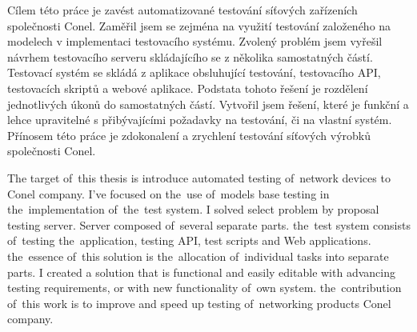 \startAbstractCz
Cílem této práce je zavést automatizované testování síťových zařízeních společnosti Conel. Zaměřil jsem se zejména na využití testování založeného na modelech v implementaci testovacího systému. Zvolený problém jsem vyřešil návrhem testovacího serveru skládajícího se z několika samostatných částí. Testovací systém se skládá z aplikace obsluhující testování, testovacího API, testovacích skriptů a webové aplikace. Podstata tohoto řešení je rozdělení jednotlivých úkonů do samostatných částí. Vytvořil jsem řešení, které je funkční a lehce upravitelné s přibývajícími požadavky na testování, či na vlastní systém. Přínosem této práce je zdokonalení a zrychlení testování síťových výrobků společnosti Conel.
\stopAbstractCz

\startAbstractEn
The target of~this thesis is introduce automated testing of~network devices to  Conel company. I've focused on the~use of~models base testing in the~implementation of~the~test system. I solved select problem by proposal testing server. Server composed of~several separate parts. the~test system consists of~testing the~application, testing API, test scripts and Web applications. the~essence of~this solution is the~allocation of~individual tasks into separate parts. I created a solution that is functional and easily editable with advancing testing requirements, or with new functionality of~own system. the~contribution of~this work is to improve and speed up testing of~networking products Conel company.

\stopAbstractEn
\endinput
